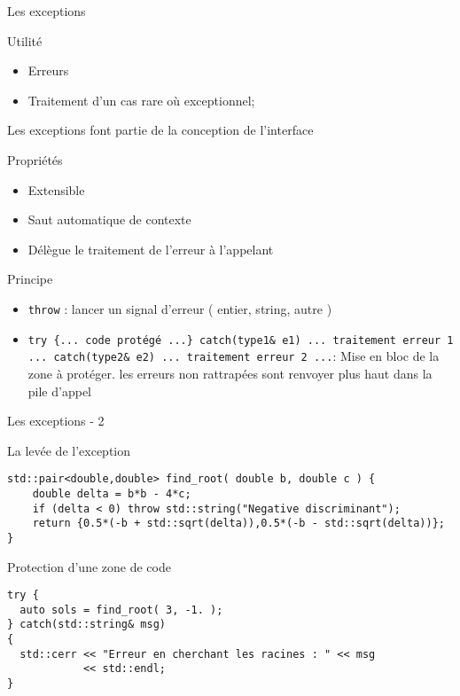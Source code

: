 \documentclass[handout,10pt]{beamer}
\begin{document}
\begin{frame}[fragile]{Les exceptions}
\tiny
\begin{block}{Utilité}
\begin{itemize}
\item Erreurs
\item Traitement d'un cas rare où exceptionnel;
\end{itemize}
\alert{Les exceptions font partie de la conception de l'interface}
\end{block}

\begin{block}{Propriétés}
\begin{itemize}
\item Extensible
\item Saut automatique de contexte
\item Délègue le traitement de l'erreur à l'appelant
\end{itemize}
\end{block}

\begin{block}{Principe}
\begin{itemize}
\item \lstinline$throw$ : lancer un signal d'erreur ( entier, string, autre )
\item \lstinline$try {... code protégé ...} catch(type1& e1) ... traitement erreur 1 ... catch(type2& e2) ... traitement erreur 2 ...$: Mise en bloc de la zone à protéger.
\alert{les erreurs non rattrapées sont renvoyer plus haut dans la pile d'appel}
\end{itemize}
\end{block}
\end{frame}

\begin{frame}[fragile]{Les exceptions - 2}

\begin{block}{La levée de l'exception}
\begin{lstlisting}
std::pair<double,double> find_root( double b, double c ) {
    double delta = b*b - 4*c;
    if (delta < 0) throw std::string("Negative discriminant");
    return {0.5*(-b + std::sqrt(delta)),0.5*(-b - std::sqrt(delta))};
}
\end{lstlisting}
\end{block}

\begin{block}{Protection d'une zone de code}
\begin{lstlisting}
try {
  auto sols = find_root( 3, -1. );
} catch(std::string& msg)
{
  std::cerr << "Erreur en cherchant les racines : " << msg 
            << std::endl;
}
\end{lstlisting}
\end{block}
\end{frame}
\end{document}
